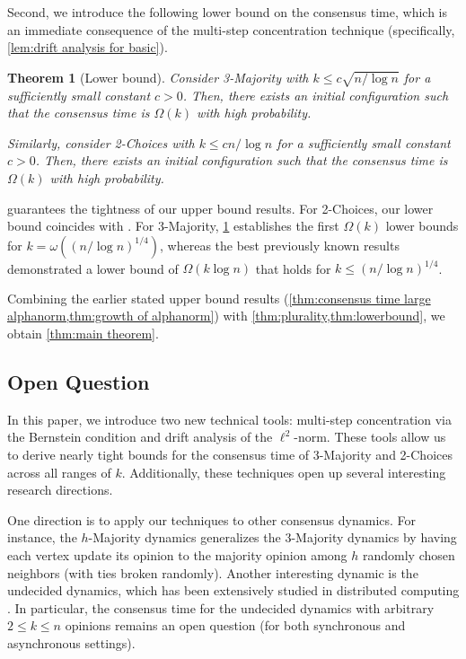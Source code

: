 \documentclass[letterpaper,11pt]{article}
\newtheorem{theorem}{Theorem}[section]
\begin{document}
Second, we introduce the following lower bound on the consensus time, which is an immediate consequence of the multi-step concentration technique (specifically, \cref{lem:drift analysis for basic}).
\begin{theorem}[Lower bound]
  \label{thm:lowerbound}
  Consider 3-Majority with $k\leq c\sqrt{n/\log n}$ for a sufficiently small constant $c>0$.
  Then, there exists an initial configuration such that the consensus time is $\Omega(k)$ with high probability.

  Similarly, consider 2-Choices with $k\leq cn/\log n$ for a sufficiently small constant $c>0$. 
  Then, there exists an initial configuration such that the consensus time is $\Omega(k)$ with high probability.
\end{theorem}
 guarantees the tightness of our upper bound results.
For 2-Choices, our lower bound coincides with \cite[Theorem 4.1]{ignore_or_comply}.
For 3-Majority, \cref{thm:lowerbound} establishes the first $\Omega(k)$ lower bounds for $k = \omega((n/\log n)^{1/4})$,
whereas the best previously known results~\cite{simple_dynamics} demonstrated a lower bound of $\Omega(k\log n)$ that holds for $k\le (n/\log n)^{1/4}$. 

Combining the earlier stated upper bound results (\cref{thm:consensus time large alphanorm,thm:growth of alphanorm}) with \cref{thm:plurality,thm:lowerbound}, we obtain \cref{thm:main theorem}.

\subsection{Open Question}
In this paper, we introduce two new technical tools: multi-step concentration via the Bernstein condition and drift analysis of the $\ell^2$-norm.
These tools allow us to derive nearly tight bounds for the consensus time of 3-Majority and 2-Choices across all ranges of $k$.
Additionally, these techniques open up several interesting research directions.

One direction is to apply our techniques to other consensus dynamics.
For instance, the $h$-Majority dynamics \cite{simple_dynamics,hierarchy_Berenbrink} generalizes the 3-Majority dynamics by having each vertex update its opinion to the majority opinion among $h$ randomly chosen neighbors (with ties broken randomly).
Another interesting dynamic is the undecided dynamics, which has been extensively studied in distributed computing \cite{undecided_Angluin,undecided_MFCS,fast_convergence_undecided,Becchetti2015-undecided,undecided-soda22}.
In particular, the consensus time for the undecided dynamics with arbitrary $2 \le k \le n$ opinions remains an open question (for both synchronous and asynchronous settings).
\end{document}
